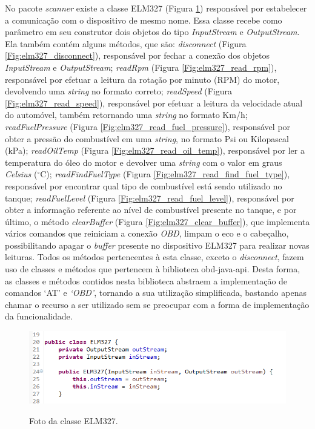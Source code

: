 No pacote \textit{scanner} existe a classe ELM327 (Figura \ref{Fig:elm327_class}) responsável por estabelecer a comunicação com o dispositivo de mesmo nome. Essa classe recebe como parâmetro em seu construtor dois objetos do tipo \textit{InputStream} e \textit{OutputStream}. Ela também contém alguns métodos, que são: \textit{disconnect} (Figura \ref{Fig:elm327_disconnect}), responsável por fechar a conexão dos objetos \textit{InputStream} e \textit{OutputStream}; \textit{readRpm} (Figura \ref{Fig:elm327_read_rpm}), responsável por efetuar a leitura da rotação por minuto (RPM) do motor, devolvendo uma \textit{string} no formato correto; \textit{readSpeed} (Figura \ref{Fig:elm327_read_speed}), responsável por efetuar a leitura da velocidade atual do automóvel, também retornando uma \textit{string} no formato Km/h; \textit{readFuelPressure} (Figura \ref{Fig:elm327_read_fuel_pressure}), responsável por obter a pressão do combustível em uma \textit{string}, no formato Psi ou Kilopascal (kPa); \textit{readOilTemp} (Figura \ref{Fig:elm327_read_oil_temp}), responsável por ler a temperatura do óleo do motor e devolver uma \textit{string} com o valor em graus \textit{Celsius} ($^{\circ}$C); \textit{readFindFuelType} (Figura \ref{Fig:elm327_read_find_fuel_type}), responsável por encontrar qual tipo de combustível está sendo utilizado no tanque; \textit{readFuelLevel} (Figura \ref{Fig:elm327_read_fuel_level}), responsável por obter a informação referente ao nível de combustível presente no tanque, e por último, o método \textit{clearBuffer} (Figura \ref{Fig:elm327_clear_buffer}), que implementa vários comandos que reiniciam a conexão \textit{OBD}, limpam o eco e o cabeçalho, possibilitando apagar o \textit{buffer} presente no dispositivo ELM327 para realizar novas leituras. Todos os métodos pertencentes à esta classe, exceto o \textit{disconnect}, fazem uso de classes e métodos que pertencem à biblioteca obd-java-api. Desta forma, as classes e métodos contidos nesta biblioteca abstraem a implementação de comandos ‘AT’ e \textit{‘OBD’}, tornando a sua utilização simplificada, bastando apenas chamar o recurso a ser utilizado sem se preocupar com a forma de implementação da funcionalidade.

\begin{figure}[!ht]
\centering
\caption{Foto da classe ELM327.} 
{\includegraphics[scale=.70]{imagens/pacoteScanner-ELM327.png}}\\
 \label{Fig:elm327_class}
\end{figure}

